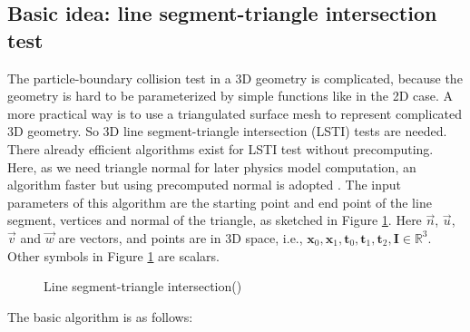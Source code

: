 \documentclass[a4paper,11pt]{article}
\begin{document}
\subsection{Basic idea: line segment-triangle intersection test}
The particle-boundary collision test in a 3D geometry is complicated, because the geometry is hard to be parameterized by simple functions like in the 2D case. A more practical way is to use a triangulated surface mesh to represent complicated 3D geometry. So 3D line segment-triangle intersection (LSTI) tests are needed. There already efficient algorithms exist for LSTI test \cite{FA} without precomputing. Here, as we need triangle normal for later physics model computation, an algorithm faster but using precomputed normal is adopted \cite{LT}. The input parameters of this algorithm are the starting point and end point of the line segment, vertices and normal of the triangle, as sketched in Figure \ref{fig:L-T}. Here $\vec{n}$, $\vec{u}$, $\vec{v}$ and  $\vec{w}$ are vectors, and points are in 3D space, i.e., $\mathbf{x}_0,\mathbf{x}_1,\mathbf{t}_0,\mathbf{t}_1,\mathbf{t}_2,\mathbf{I} \in \mathbb{R}^3$. Other symbols in Figure \ref{fig:L-T} are scalars.  \\
\begin{figure}[H]
\begin{center}

\end{center}
\caption{Line segment-triangle intersection()\label{fig:L-T}}
\end{figure}
The basic algorithm is as follows:
\end{document}
